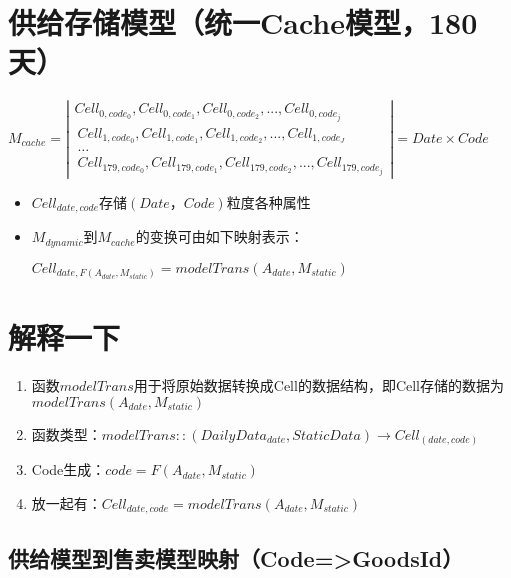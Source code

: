 \documentclass[a4paper]{article}
\begin{document}
\section{供给存储模型（统一Cache模型，180天）}
\begin{center}
$M_{cache} = \left|\begin{array}{ccc}
Cell_{0,code_0},Cell_{0,code_1},Cell_{0,code_2},...,Cell_{0,code_j} \\\
Cell_{1,code_0},Cell_{1,code_1},Cell_{1,code_2},...,Cell_{1,code_J} \\\
\dots \\\
Cell_{179,code_0},Cell_{179,code_1},Cell_{179,code_2},...,Cell_{179,code_j}
\end{array} \right|
= Date \times Code$
\end{center}

\begin{itemize}
    \item $Cell_{date,code}$存储$(Date，Code)$粒度各种属性
    \item $M_{dynamic}$到$M_{cache}$的变换可由如下映射表示：
    \begin{center}
        $Cell_{date, F(A_{date},M_{static})} = modelTrans(A_{date},M_{static})$
    \end{center}
\end{itemize}

\section{解释一下}
\begin{enumerate}
    \item 函数$modelTrans$用于将原始数据转换成Cell的数据结构，即Cell存储的数据为$modelTrans(A_{date},M_{static})$
    \item 函数类型：$modelTrans::(DailyData_{date}, StaticData) \to Cell_{(date,code)}$
    \item Code生成：$code=F(A_{date},M_{static})$
    \item 放一起有：$Cell_{date,code} = modelTrans(A_{date},M_{static})$
\end{enumerate}
\subsection{ 供给模型到售卖模型映射（Code=>GoodsId）}
\end{document}
